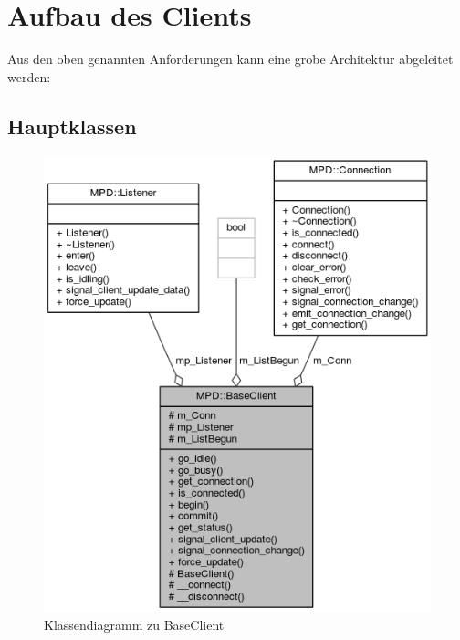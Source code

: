 \section{Aufbau des Clients}

Aus den oben genannten Anforderungen kann eine grobe Architektur abgeleitet werden:


\subsection{Hauptklassen}

\begin{figure}[htb!]
	\centering
        \includegraphics[scale=0.55]{BaseClientCollab.png}
	\caption{Klassendiagramm zu BaseClient}
	\label{collab_base_client}
\end{figure}

